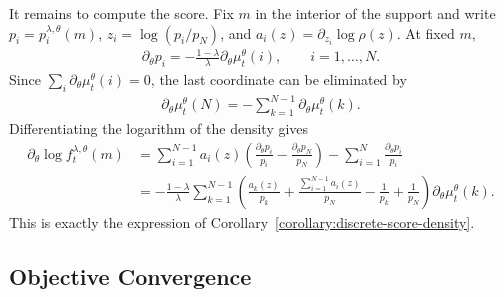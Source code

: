 It remains to compute the score. Fix $m$ in the interior of the support and write $p_i=p_i^{\lambda,\theta}(m)$, $z_i=\log(p_i/p_N)$, and $a_i(z)=\partial_{z_i}\log\rho(z)$. At fixed $m$,
\begin{align}
    \partial_\theta p_i
    =
    -\frac{1-\lambda}{\lambda}\partial_\theta\mu_t^\theta(i),
    \qquad
    i=1,\ldots,N.
\end{align}
Since $\sum_i\partial_\theta\mu_t^\theta(i)=0$, the last coordinate can be eliminated by
\begin{align}
    \partial_\theta\mu_t^\theta(N)
    =
    -\sum_{k=1}^{N-1}\partial_\theta\mu_t^\theta(k).
\end{align}
Differentiating the logarithm of the density gives
\begin{align}
    \partial_\theta \log f_t^{\lambda,\theta}(m)
    &=
    \sum_{i=1}^{N-1}a_i(z)\left(\frac{\partial_\theta p_i}{p_i}-\frac{\partial_\theta p_N}{p_N}\right)
    -
    \sum_{i=1}^N\frac{\partial_\theta p_i}{p_i}\\
    &=
    -\frac{1-\lambda}{\lambda}
    \sum_{k=1}^{N-1}
    \left(
        \frac{a_k(z)}{p_k}
        +
        \frac{\sum_{i=1}^{N-1}a_i(z)}{p_N}
        -
        \frac{1}{p_k}
        +
        \frac{1}{p_N}
    \right)
    \partial_\theta\mu_t^\theta(k).
\end{align}
This is exactly the expression of Corollary~\ref{corollary:discrete-score-density}.

\subsection{Objective Convergence}
\label{appendix:objective-convergence-proofs}

